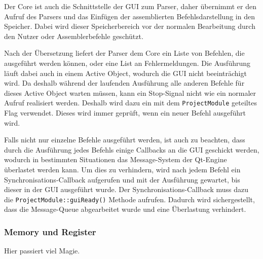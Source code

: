 Der Core ist auch die Schnittstelle der GUI zum Parser, daher übernimmt er den
Aufruf des Parsers und das Einfügen der assemblierten Befehlsdarstellung in den
Speicher. Dabei wird dieser Speicherbereich vor der normalen Bearbeitung durch
den Nutzer oder Assemblerbefehle geschützt.

Nach der Übersetzung liefert der Parser dem Core ein Liste von Befehlen, die
ausgeführt werden können, oder eine List an Fehlermeldungen. Die Ausführung
läuft dabei auch in einem Active Object, wodurch die GUI nicht beeinträchigt
wird. Da deshalb während der laufenden Ausführung alle anderen Befehle für
dieses Active Object warten müssen, kann ein Stop-Signal nicht wie ein normaler
Aufruf realisiert werden. Deshalb wird dazu ein mit dem \texttt{ProjectModule}
geteiltes Flag verwendet. Dieses wird immer geprüft, wenn ein neuer Befehl
ausgeführt wird.

Falls nicht nur einzelne Befehle ausgeführt werden, ist auch zu beachten, dass
durch die Ausführung jedes Befehls einige Callbacks an die GUI geschickt werden,
wodurch in bestimmten Situationen das Message-System der Qt-Engine überlastet
werden kann. Um dies zu verhindern, wird nach jedem Befehl ein
Synchronisations-Callback aufgerufen und mit der Ausführung gewartet, bis dieser
in der GUI ausgeführt wurde. Der Synchronisations-Callback muss dazu die
\texttt{ProjectModule::guiReady()} Methode aufrufen. Dadurch wird
sichergestellt, dass die Message-Queue abgearbeitet wurde und eine Überlastung
verhindert.

\subsubsection{Memory und Register}

Hier passiert viel Magie.
